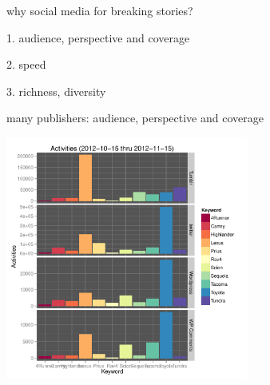 \documentclass{beamer}
\begin{document}

\begin{frame}
\begin{center}
{\Huge why social media for breaking stories? }
\end{center}
\end{frame}


\begin{frame}
\begin{center}
{\Huge 1. audience, perspective and coverage }
\end{center}
\end{frame}

\begin{frame}
\begin{center}
{\Huge 2. speed }
\end{center}
\end{frame}

\begin{frame}
\begin{center}
{\Huge 3. richness, diversity }
\end{center}
\end{frame}


\begin{frame}
\begin{center}
{\Huge many publishers: audience, perspective and coverage }
\end{center}
\end{frame}

\begin{frame}
  \begin{center}
    \includegraphics[width=8cm]{./imgs/bars.pdf}
  \end{center}
\end{frame}
\end{document}
